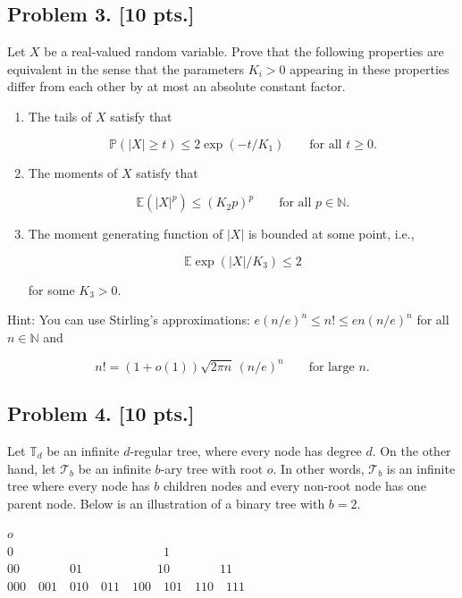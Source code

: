\documentclass[11pt,a4paper]{article}
\begin{document}
\subsection{Problem 3. [10 pts.]}
Let \( X \) be a real-valued random variable. Prove that the following properties are equivalent in the sense that the parameters \( K_i > 0 \) appearing in these properties differ from each other by at most an absolute constant factor.
\begin{enumerate}[label=(\alph*)]
    \item The tails of \( X \) satisfy that

    \[
    \mathbb{P}(|X| \ge t) \le 2 \exp(-t/K_1) \qquad \text{for all } t \ge 0.
    \]
    \item The moments of \( X \) satisfy that

    \[
    \mathbb{E}(|X|^p) \le (K_2 p)^p \qquad \text{for all } p \in \mathbb{N}.
    \]
    \item The moment generating function of \( |X| \) is bounded at some point, i.e.,

    \[
    \mathbb{E} \exp(|X|/K_3) \le 2
    \]

    for some \( K_3 > 0 \).
\end{enumerate}
Hint: You can use Stirling's approximations: \( e(n/e)^n \le n! \le e n (n/e)^n \) for all \( n \in \mathbb{N} \) and

\[
n! = (1+o(1))\sqrt{2\pi n}\,(n/e)^n \qquad \text{for large } n.
\]

\subsection{Problem 4. [10 pts.]}
Let \( \mathbb{T}_d \) be an infinite \( d \)-regular tree, where every node has degree \( d \). On the other hand, let \( \mathcal{T}_b \) be an infinite \( b \)-ary tree with root \( o \). In other words, \( \mathcal{T}_b \) is an infinite tree where every node has \( b \) children nodes and every non-root node has one parent node. Below is an illustration of a binary tree with \( b = 2 \).

\begin{center}
\small
\( o \)\\[0.7em]
\( 0 \qquad\qquad\qquad\qquad\qquad\qquad 1 \)\\[0.7em]
\( 00 \qquad\qquad 01 \qquad\qquad\qquad 10 \qquad\qquad 11 \)\\[0.7em]
\( 000 \quad 001 \quad 010 \quad 011 \quad 100 \quad 101 \quad 110 \quad 111 \)
\end{center}
\end{document}
